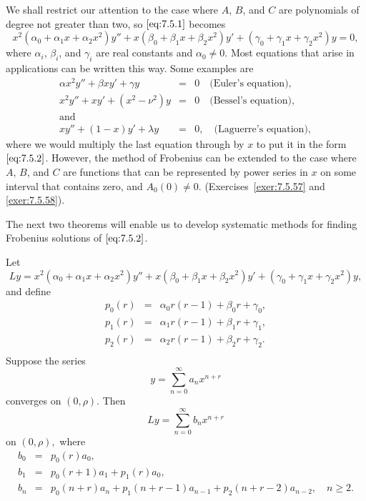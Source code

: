 \documentclass{ximera}
\begin{document}
We shall restrict our attention to the case where $A$, $B$, and $C$ are
polynomials of degree not greater than two, so $\eqref{eq:7.5.1}$ becomes
\begin{equation} \label{eq:7.5.2}
x^2(\alpha_0+\alpha_1x+\alpha_2x^2)y''+x(\beta_0+\beta_1x+\beta_2x^2)y'
+(\gamma_0+\gamma_1x+\gamma_2x^2)y=0,
\end{equation}
where $\alpha_i$, $\beta_i$, and $\gamma_i$ are real constants and
$\alpha_0\neq 0$. Most  equations that arise in
applications can be written this way. Some examples are
\begin{eqnarray*}
\alpha x^2y''+\beta xy'+\gamma y&=&0 \quad\mbox{(Euler's equation)},
\\
x^2y''+xy'+(x^2-\nu^2)y&=&0 \quad\mbox{(Bessel's equation)},\\
\mbox{and}\\
xy''+(1-x)y'+\lambda y&=&0,
\quad\mbox{(Laguerre's equation)},
\end{eqnarray*}
where we would multiply the last equation through by $x$ to put it in the form $\eqref{eq:7.5.2}$. However, the method of Frobenius can be
extended to the case where $A$, $B$, and $C$ are functions that can be
represented by power series in $x$ on some interval that contains zero,
and $A_0(0)\neq 0$.
(Exercises~\ref{exer:7.5.57} and \ref{exer:7.5.58}).

The next two theorems will enable us to develop systematic methods for finding Frobenius solutions of $\eqref{eq:7.5.2}$.

\begin{theorem}\label{thmtype:7.5.1}
Let
$$
Ly=
x^2(\alpha_0+\alpha_1x+\alpha_2x^2)y''+x(\beta_0+\beta_1x+\beta_2x^2)y'
+(\gamma_0+\gamma_1x+\gamma_2x^2)y,
$$
and define
\begin{eqnarray*}
p_0(r)&=&\alpha_0r(r-1)+\beta_0r+\gamma_0,\\
p_1(r)&=&\alpha_1r(r-1)+\beta_1r+\gamma_1,\\
p_2(r)&=&\alpha_2r(r-1)+\beta_2r+\gamma_2.\\
\end{eqnarray*}
Suppose the series
\begin{equation} \label{eq:7.5.3}
y=\sum_{n=0}^\infty a_nx^{n+r}
\end{equation}
converges on $(0,\rho)$.
 Then
\begin{equation} \label{eq:7.5.4}
Ly=\sum_{n=0}^\infty b_nx^{n+r}
\end{equation}
on $(0,\rho),$
where
\begin{equation} \label{eq:7.5.5}
\begin{array}{ccl}
b_0&=&p_0(r)a_0,\\
b_1&=&p_0(r+1)a_1+p_1(r)a_0,\\
b_n&=&p_0(n+r)a_n+p_1(n+r-1)a_{n-1}+p_2(n+r-2)a_{n-2},\quad n\geq2.
\end{array}
\end{equation}
\end{theorem}
\end{document}
